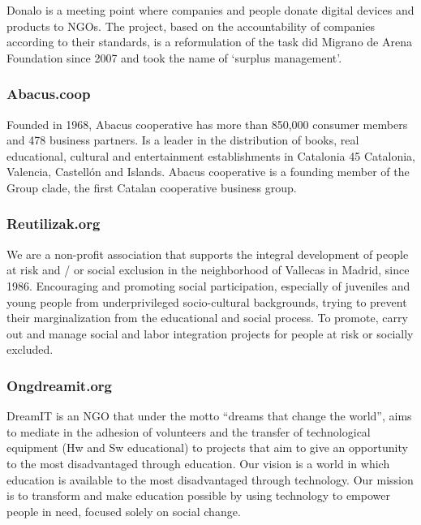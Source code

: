 \documentclass[
]{book}
\begin{document}
Donalo is a meeting point where companies and people donate digital devices and products to NGOs. The project, based on the accountability of companies according to their standards, is a reformulation of the task did Migrano de Arena Foundation since 2007 and took the name of `surplus management'.

\hypertarget{abacus.coop}{%
\subsubsection{Abacus.coop}\label{abacus.coop}}

Founded in 1968, Abacus cooperative has more than 850,000 consumer members and 478 business partners. Is a leader in the distribution of books, real educational, cultural and entertainment establishments in Catalonia 45 Catalonia, Valencia, Castellón and Islands. Abacus cooperative is a founding member of the Group clade, the first Catalan cooperative business group.

\hypertarget{reutilizak.org}{%
\subsubsection{Reutilizak.org}\label{reutilizak.org}}

We are a non-profit association that supports the integral development of people at risk and / or social exclusion in the neighborhood of Vallecas in Madrid, since 1986. Encouraging and promoting social participation, especially of juveniles and young people from underprivileged socio-cultural backgrounds, trying to prevent their marginalization from the educational and social process. To promote, carry out and manage social and labor integration projects for people at risk or socially excluded.

\hypertarget{ongdreamit.org}{%
\subsubsection{Ongdreamit.org}\label{ongdreamit.org}}

DreamIT is an NGO that under the motto ``dreams that change the world'', aims to mediate in the adhesion of volunteers and the transfer of technological equipment (Hw and Sw educational) to projects that aim to give an opportunity to the most disadvantaged through education. Our vision is a world in which education is available to the most disadvantaged through technology. Our mission is to transform and make education possible by using technology to empower people in need, focused solely on social change.
\end{document}
